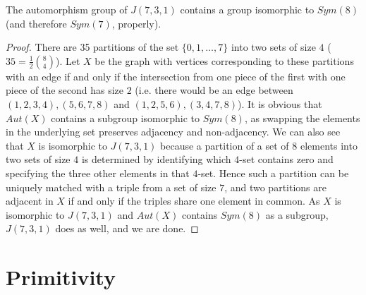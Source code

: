 \begin{lemma}
	
	The automorphism group of $J(7,3,1)$ contains a group isomorphic to $Sym(8)$ (and therefore $Sym(7)$, properly).
	
	
\end{lemma}  

\begin{proof}
	
	
	There are 35 partitions of the set $\{0,1,\dots,7\}$ into two sets of size $4$ ($35=\frac{1}{2}\binom{8}{4}$).  Let $X$ be the graph with vertices corresponding to these partitions with an edge if and only if the intersection from one piece of the first with one piece of the second has size $2$ (i.e. there would be an edge between $(1,2,3,4),(5,6,7,8)$ and $(1,2,5,6),(3,4,7,8)$).  It is obvious that $Aut(X)$ contains a subgroup isomorphic to $Sym(8)$, as swapping the elements in the underlying set preserves adjacency and non-adjacency.  We can also see that $X$ is isomorphic to $J(7,3,1)$ because a partition of a set of $8$ elements into two sets of size $4$ is determined by identifying which $4$-set contains zero and specifying the three other elements in that $4$-set.  Hence such a partition can be uniquely matched with a triple from a set of size $7$, and two partitions are adjacent in $X$ if and only if the triples share one element in common.  As $X$ is isomorphic to $J(7,3,1)$ and $Aut(X)$ contains $Sym(8)$ as a subgroup, $J(7,3,1)$ does as well, and we are done.
	
	
\end{proof}




\section*{Primitivity}



